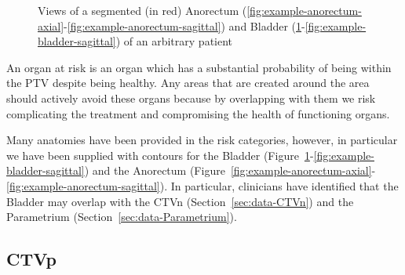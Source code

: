 \documentclass[12pt,twoside]{report}
\begin{document}
\begin{figure}[H]
{   \label{fig:example-bladder-axial}
  }
  \caption{Views of a segmented (in red) Anorectum (\ref{fig:example-anorectum-axial}-\ref{fig:example-anorectum-sagittal}) and Bladder (\ref{fig:example-bladder-axial}-\ref{fig:example-bladder-sagittal}) of an arbitrary patient}
\end{figure}

An organ at risk is an organ which has a substantial probability of being within the PTV despite being healthy. Any areas that are created around the area should actively avoid these organs because by overlapping with them we risk complicating the treatment and compromising the health of functioning organs.

Many anatomies have been provided in the risk categories, however, in particular we have been supplied with contours for the Bladder (Figure~\ref{fig:example-bladder-axial}-\ref{fig:example-bladder-sagittal}) and the Anorectum (Figure~\ref{fig:example-anorectum-axial}-\ref{fig:example-anorectum-sagittal}). In particular, clinicians have identified that the Bladder may overlap with the CTVn (Section~\ref{sec:data-CTVn}) and the Parametrium (Section~\ref{sec:data-Parametrium}).

\subsection{CTVp}\label{sec:data-CTVp}
\end{document}
